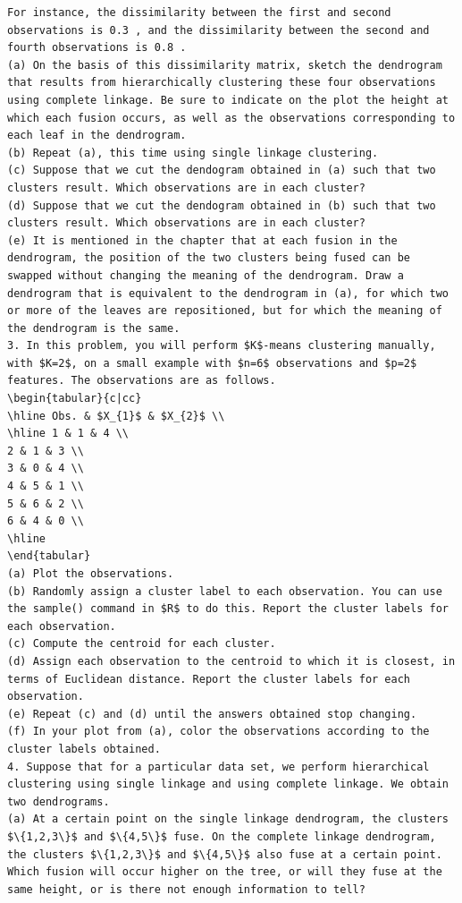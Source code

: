 \documentclass[10pt]{article}
\begin{document}
\begin{verbatim}
For instance, the dissimilarity between the first and second observations is 0.3 , and the dissimilarity between the second and fourth observations is 0.8 .
(a) On the basis of this dissimilarity matrix, sketch the dendrogram that results from hierarchically clustering these four observations using complete linkage. Be sure to indicate on the plot the height at which each fusion occurs, as well as the observations corresponding to each leaf in the dendrogram.
(b) Repeat (a), this time using single linkage clustering.
(c) Suppose that we cut the dendogram obtained in (a) such that two clusters result. Which observations are in each cluster?
(d) Suppose that we cut the dendogram obtained in (b) such that two clusters result. Which observations are in each cluster?
(e) It is mentioned in the chapter that at each fusion in the dendrogram, the position of the two clusters being fused can be swapped without changing the meaning of the dendrogram. Draw a dendrogram that is equivalent to the dendrogram in (a), for which two or more of the leaves are repositioned, but for which the meaning of the dendrogram is the same.
3. In this problem, you will perform $K$-means clustering manually, with $K=2$, on a small example with $n=6$ observations and $p=2$ features. The observations are as follows.
\begin{tabular}{c|cc}
\hline Obs. & $X_{1}$ & $X_{2}$ \\
\hline 1 & 1 & 4 \\
2 & 1 & 3 \\
3 & 0 & 4 \\
4 & 5 & 1 \\
5 & 6 & 2 \\
6 & 4 & 0 \\
\hline
\end{tabular}
(a) Plot the observations.
(b) Randomly assign a cluster label to each observation. You can use the sample() command in $R$ to do this. Report the cluster labels for each observation.
(c) Compute the centroid for each cluster.
(d) Assign each observation to the centroid to which it is closest, in terms of Euclidean distance. Report the cluster labels for each observation.
(e) Repeat (c) and (d) until the answers obtained stop changing.
(f) In your plot from (a), color the observations according to the cluster labels obtained.
4. Suppose that for a particular data set, we perform hierarchical clustering using single linkage and using complete linkage. We obtain two dendrograms.
(a) At a certain point on the single linkage dendrogram, the clusters $\{1,2,3\}$ and $\{4,5\}$ fuse. On the complete linkage dendrogram, the clusters $\{1,2,3\}$ and $\{4,5\}$ also fuse at a certain point. Which fusion will occur higher on the tree, or will they fuse at the same height, or is there not enough information to tell?

\end{verbatim}
\end{document}
